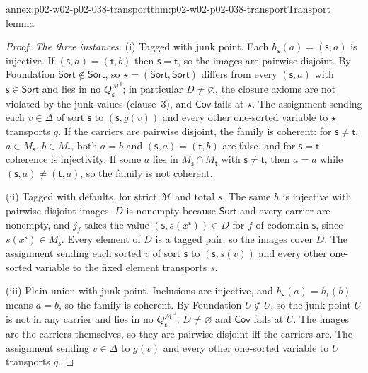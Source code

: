 \begin{annexitem}{annex:p02-w02-p02-038-transport}{thm:p02-w02-p02-038-transport}{Transport lemma}
\begin{proof}
\emph{The three instances.}  (i) Tagged with junk point.  Each
\(h_{\mathsf s}(a)=(\mathsf s,a)\) is injective.  If
\((\mathsf s,a)=(\mathsf t,b)\) then \(\mathsf s=\mathsf t\), so the images
are pairwise disjoint.  By Foundation \(\mathsf{Sort}\notin\mathsf{Sort}\), so
\(\star=(\mathsf{Sort},\mathsf{Sort})\) differs from every \((\mathsf s,a)\)
with \(\mathsf s\in\mathsf{Sort}\) and lies in no
\(Q_{\mathsf s}^{\mathcal M^{\sharp}}\); in particular \(D\ne\varnothing\),
the closure axioms are not violated by the junk values (clause~3), and
\(\mathsf{Cov}\) fails at \(\star\).  The assignment sending each
\(v\in\Delta\) of sort \(\mathsf s\) to \((\mathsf s,g(v))\) and every other
one-sorted variable to \(\star\) transports \(g\).  If the carriers are
pairwise disjoint, the family is coherent: for \(\mathsf s\ne\mathsf t\),
\(a\in M_{\mathsf s}\), \(b\in M_{\mathsf t}\), both \(a=b\) and
\((\mathsf s,a)=(\mathsf t,b)\) are false, and for \(\mathsf s=\mathsf t\)
coherence is injectivity.  If some \(a\) lies in \(M_{\mathsf s}\cap
M_{\mathsf t}\) with \(\mathsf s\ne\mathsf t\), then \(a=a\) while
\((\mathsf s,a)\ne(\mathsf t,a)\), so the family is not coherent.

(ii) Tagged with defaults, for strict \(\mathcal M\) and total \(s\).  The
same \(h\) is injective with pairwise disjoint images.  \(D\) is nonempty
because \(\mathsf{Sort}\) and every carrier are nonempty, and
\(j_f\) takes the value \((\mathsf s,s(x^{\mathsf s}))\in D\) for \(f\) of
codomain \(\mathsf s\), since \(s(x^{\mathsf s})\in M_{\mathsf s}\).  Every
element of \(D\) is a tagged pair, so the images cover \(D\).  The
assignment sending each sorted \(v\) of sort \(\mathsf s\) to
\((\mathsf s,s(v))\) and every other one-sorted variable to the fixed
element transports \(s\).

(iii) Plain union with junk point.  Inclusions are injective, and
\(h_{\mathsf s}(a)=h_{\mathsf t}(b)\) means \(a=b\), so the family is
coherent.  By Foundation \(U\notin U\), so the junk point \(U\) is not in any
carrier and lies in no \(Q_{\mathsf s}^{\mathcal M^{\cup}}\); \(D\ne\varnothing\)
and \(\mathsf{Cov}\) fails at \(U\).  The images are the carriers
themselves, so they are pairwise disjoint iff the carriers are.  The
assignment sending \(v\in\Delta\) to \(g(v)\) and every other one-sorted
variable to \(U\) transports \(g\).
\end{proof}
\end{annexitem}

